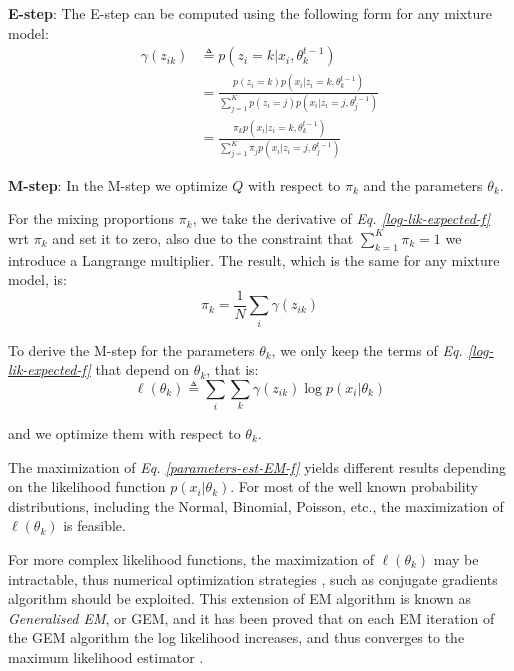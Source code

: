 \noindent
\textbf{E-step}: The E-step can be computed using the following form for any mixture model:
\begin{equation} \label{responsibilities-f}
  \begin{split}
	\gamma(z_{ik}) & \triangleq p(z_{i}=k|x_{i},\theta_{k}^{t-1}) \\
				   & = \frac{p(z_{i}=k)p(x_{i}|z_{i}=k,\theta_{k}^{t-1})}{\sum\limits_{j=1}^{K} p(z_{i}=j)p(x_{i}|z_{i}=j,\theta_{j}^{t-1})} \\
				   & = \frac{\pi_{k}p(x_{i}|z_{i}=k,\theta_{k}^{t-1})}{\sum\limits_{j=1}^{K} \pi_{j}p(x_{i}|z_{i}=j,\theta_{j}^{t-1})}
  \end{split}
\end{equation}

\noindent
\textbf{M-step}: In the M-step we optimize $Q$ with respect to $\pi_{k}$ and the parameters $\theta_{k}$.

For the mixing proportions $\pi_{k}$, we take the derivative of \emph{Eq. \ref{log-lik-expected-f}} wrt $\pi_{k}$ and set it to zero, also due to the constraint that $\sum_{k=1}^{K}\pi_{k} = 1$ we introduce a Langrange multiplier. The result, which is the same for any mixture model, is:
\begin{equation} \label{mixing-proportions-est-f}
		\pi_{k} = \frac{1}{N} \sum_{i} \gamma(z_{ik})
\end{equation}

To derive the M-step for the parameters $\theta_{k}$, we only keep the terms of \emph{Eq. \ref{log-lik-expected-f}} that depend on $\theta_{k}$, that is:
\begin{equation} \label{parameters-est-EM-f}
		\ell(\theta_{k}) \triangleq \sum_{i} \sum_{k} \gamma(z_{ik}) \log p(x_{i}|\theta_{k})
\end{equation}

and we optimize them with respect to $\theta_{k}$.

The maximization of \emph{Eq. \ref{parameters-est-EM-f}} yields different results depending on the likelihood function $p(x_{i}|\theta_{k})$. For most of the well known probability distributions, including the Normal, Binomial, Poisson, etc., the maximization of $\ell(\theta_{k})$ is feasible. 

For more complex likelihood functions, the maximization of $\ell(\theta_{k})$ may be intractable, thus numerical optimization strategies \citep{Nocedal2006}, such as conjugate gradients algorithm \citep{Hestenes1952} should be exploited. This extension of EM algorithm is known as \emph{Generalised EM}, or GEM, and it has been proved that on each EM iteration of the GEM algorithm the log likelihood increases, and thus converges to the maximum likelihood estimator \citep{Wu1983}.

